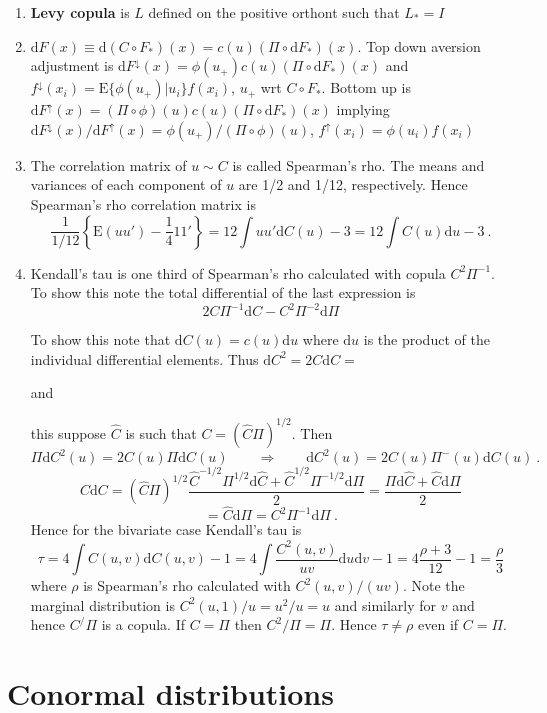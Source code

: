 \documentclass[useAMS,usenatbib,referee]{article}
\newcommand{\E}{{\mathrm E}}
\newcommand{\de}{\mathrm{d}}
\begin{document}
\begin{enumerate}
\item  {\bf Levy copula} is $L$ defined on the positive orthont such that $L_*=I$

\item $\de F(x)\equiv \de(C\circ F_*)(x)=c(u)(\Pi\circ \de F_*)(x)$.   Top down aversion adjustment is 
$\de F^\downarrow(x)=\phi(u_+)c(u)(\Pi\circ\de F_*)(x)$ and $f^\downarrow(x_i)= \E\{\phi(u_+)|u_i\} f(x_i)$, $u_+$  wrt $C\circ F_*$.
Bottom up is $\de F^\uparrow(x)=(\Pi\circ \phi)(u)c(u)(\Pi\circ \de F_*)(x)$ implying $\de  F^\downarrow(x)/\de F^\uparrow(x)=\phi(u_+)/(\Pi\circ \phi)(u)$, $f^\uparrow(x_i)=\phi(u_i)f(x_i)$ 

\item The correlation matrix of $u\sim C$ is called Spearman's rho.   The means and variances of each component of $u$  are 1/2 and 1/12, respectively.   Hence Spearman's rho correlation matrix is
$$
\frac{1}{1/12}\left\{\E(uu')-\frac{1}{4}11'\right\} = 12\int uu'\de C(u)-3 = 12\int C(u)\de u - 3\ .
$$

\item Kendall's tau is one third of  Spearman's rho calculated with copula $C^2\Pi^{-1}$.   To show this note the total differential of the last expression is 
$$
2C\Pi^{-1}\de C- C^2\Pi^{-2}\de \Pi
$$



To show this note that $\de C(u)=c(u)\de u$ where $\de u$ is the product of the individual differential elements.   Thus $\de C^2=2C\de C=$


 and 


 this suppose $\hat C$ is such that $C=(\hat C\Pi)^{1/2}$.  Then  
$$
\Pi\de C^2(u)=2C(u)\Pi\de C(u)\qquad\Rightarrow\qquad\de C^2(u)=2C(u)\Pi^-(u)\de C(u)\ .
$$
$$
C\de C=(\hat C\Pi)^{1/2}\frac{\hat C^{-1/2}\Pi^{1/2}\de \hat C+\hat C^{1/2}\Pi^{-1/2}\de\Pi}{2} = \frac{\Pi\de\hat C+\hat C\de\Pi}{2}
$$$$= \hat C\de\Pi =C^2\Pi^{-1}\de\Pi\ .
$$
Hence for the bivariate case Kendall's tau is
$$
\tau=4\int C(u,v)\de C(u,v)-1 = 4\int \frac{C^2(u,v)}{uv}\de u \de v-1
= 4\frac{\rho+3}{12} - 1 = \frac{\rho}{3}
$$
where  $\rho$ is Spearman's rho 
calculated with $C^2(u,v)/(uv)$.  Note the marginal distribution is $C^2(u,1)/u=u^2/u=u$ and similarly for $v$ and hence $C^/\Pi$ is a copula.  If $C=\Pi$ then $C^2/\Pi=\Pi$.  Hence $\tau\ne\rho$ even if $C=\Pi$.
\end{enumerate}

\section*{Conormal distributions}
\end{document}

